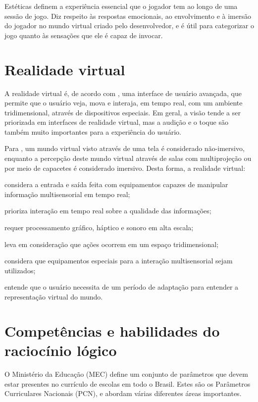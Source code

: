 Estéticas definem a experiência essencial que o jogador tem ao longo de uma sessão de
jogo. Diz respeito às respostas emocionais, ao envolvimento e à imersão do jogador no
mundo virtual criado pelo desenvolvedor, e é útil para categorizar o jogo quanto às
sensações que ele é capaz de invocar.

\section{Realidade virtual}\label{sec-realidadevirtual}

A realidade virtual é, de acordo com \cite{kirner:2007:RV_e_RA}, uma interface de
usuário avançada, que permite que o usuário veja, mova e interaja, em tempo real, 
com um ambiente tridimensional, através de dispositivos especiais. Em geral, a visão
tende a ser priorizada em interfaces de realidade virtual, mas a audição e o toque 
são também muito importantes para a experiência do usuário.

Para \cite{kirner:2011:evolucao_RV}, um mundo virtual visto através de uma tela é
considerado não-imersivo, enquanto a percepção deste mundo virtual através de salas 
com multiprojeção ou por meio de capacetes é considerado imersivo. Desta forma, a
realidade virtual:

\begin{alineas}
	\item considera a entrada e saída feita com equipamentos capazes de manipular 
	informação multisensorial em tempo real;
	\item prioriza interação em tempo real sobre a qualidade das informações;
	\item requer processamento gráfico, háptico e sonoro em alta escala;
	\item leva em consideração que ações ocorrem em um espaço tridimensional;
	\item considera que equipamentos especiais para a interação multisensorial sejam
	utilizados;
	\item entende que o usuário necessita de um período de adaptação para entender a
	representação virtual do mundo.
\end{alineas}

\section{Competências e habilidades do raciocínio lógico}\label{sec-competenciashabilidades}

O Ministério da Educação (MEC) define um conjunto de parâmetros que devem estar
presentes no currículo de escolas em todo o Brasil. Estes são os Parâmetros
Curriculares Nacionais (PCN), e abordam várias diferentes áreas importantes. 

